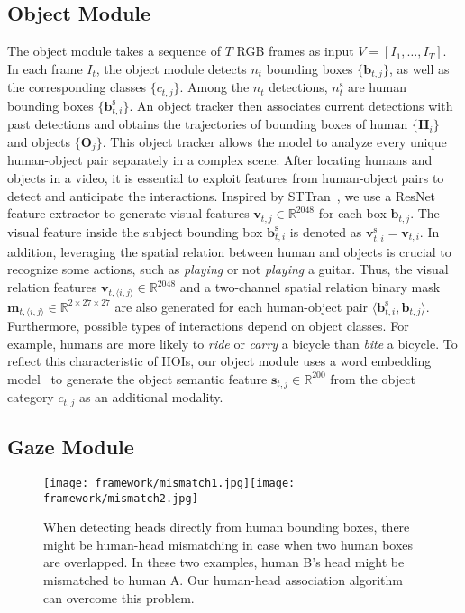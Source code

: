 \documentclass[times,twocolumn,final,authoryear]{elsarticle}
\begin{document}
\subsection{Object Module}
The object module takes a sequence of $T$ RGB frames as input $V=[I_1, \dots, I_T]$. In each frame $I_t$, the object module detects $n_t$ bounding boxes $\{\mathbf{b}_{t,j}\}$, as well as the corresponding classes $\{c_{t,j}\}$. Among the $n_t$ detections, $n_t^\text{s}$ are human bounding boxes $\{\mathbf{b}_{t,i}^\text{s}\}$. An object tracker then associates current detections with past detections and obtains the trajectories of bounding boxes of human $\{\mathbf{H}_i\}$ and objects $\{\mathbf{O}_j\}$. This object tracker allows the model to analyze every unique human-object pair separately in a complex scene. After locating humans and objects in a video, it is essential to exploit features from human-object pairs to detect and anticipate the interactions. Inspired by STTran~\citep{hoi_v2:sttran}, we use a ResNet feature extractor to generate visual features $\mathbf{v}_{t,j} \in \mathbb{R}^{2048}$ for each box $\mathbf{b}_{t,j}$. The visual feature inside the subject bounding box $\mathbf{b}_{t,i}^\text{s}$ is denoted as $\mathbf{v}_{t,i}^\text{s}=\mathbf{v}_{t,i}$. In addition, leveraging the spatial relation between human and objects is crucial to recognize some actions, such as \emph{playing} or not \emph{playing} a guitar. Thus, the visual relation features $\mathbf{v}_{t,\langle i,j \rangle} \in \mathbb{R}^{2048}$ and a two-channel spatial relation binary mask $\mathbf{m}_{t,\langle i,j \rangle} \in \mathbb{R}^{2 \times 27 \times 27}$ are also generated for each human-object pair $\langle \mathbf{b}_{t,i}^\text{s}, \mathbf{b}_{t,j} \rangle$. Furthermore, possible types of interactions depend on object classes. For example, humans are more likely to \emph{ride} or \emph{carry} a bicycle than \emph{bite} a bicycle. To reflect this characteristic of HOIs, our object module uses a word embedding model~\citep{semantic:glove} to generate the object semantic feature $\mathbf{s}_{t,j} \in \mathbb{R}^{200}$ from the object category $c_{t,j}$ as an additional modality. 

\subsection{Gaze Module}

\begin{figure}
    \centering
    \texttt{[image: framework/mismatch1.jpg]}\hspace{1em}\texttt{[image: framework/mismatch2.jpg]}
    \caption{When detecting heads directly from human bounding boxes, there might be human-head mismatching in case when two human boxes are overlapped. In these two examples, human B's head might be mismatched to human A. Our human-head association algorithm can overcome this problem.}
    \label{fig:mismatch}
\end{figure}
\end{document}

